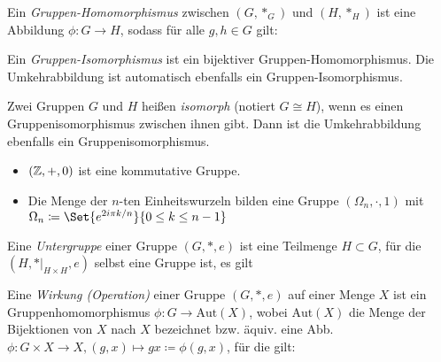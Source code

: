 \documentclass{cheat-sheet}
\begin{document}

\begin{defn}
  Ein \emph{Gruppen-Homomorphismus} zwischen $(G, *_G)$ und $(H, *_H)$ ist eine Abbildung $\phi : G \to H$, sodass für alle $g, h \in G$ gilt:
  \begin{itemize}
  \end{itemize}
\end{defn}

\begin{defn}
  Ein \emph{Gruppen-Isomorphismus} ist ein bijektiver Gruppen-Homomorphismus. Die Umkehrabbildung ist automatisch ebenfalls ein Gruppen-Isomorphismus.
\end{defn}

\begin{defn}
  Zwei Gruppen $G$ und $H$ heißen \emph{isomorph} (notiert $G \cong H$), wenn es einen Gruppenisomorphismus zwischen ihnen gibt. Dann ist die Umkehrabbildung ebenfalls ein Gruppenisomorphismus.
\end{defn}

\begin{bspe}
  \begin{itemize}
    \item $(\mathbb{Z}, +, 0)$ ist eine kommutative Gruppe.
    \item Die Menge der $n$-ten Einheitswurzeln bilden eine Gruppe $(\Omega_n, \cdot, 1)$ mit $\Omega_n \coloneqq \Set{ e^{2i \pi k/n} }{ 0 \leq k \leq n - 1 }$
  \end{itemize}
\end{bspe}

\begin{defn}
  Eine \emph{Untergruppe} einer Gruppe $(G, *, e)$ ist eine Teilmenge $H \subset G$, für die $(H, *|_{H \times H}, e)$ selbst eine Gruppe ist, \dh{} es gilt
  \begin{itemize}
  \end{itemize}
\end{defn}



\begin{defn}
  Eine \emph{Wirkung (Operation)} einer Gruppe $(G, *, e)$ auf einer Menge $X$ ist ein Gruppenhomomorphismus $\phi : G \to \mathrm{Aut}(X)$, wobei $\mathrm{Aut}(X)$ die Menge der Bijektionen von $X$ nach $X$ bezeichnet bzw. äquiv. eine Abb. $\phi : G \times X \to X, (g, x) \mapsto gx \coloneqq \phi(g, x)$, für die gilt:
  \begin{itemize}
  \end{itemize}
\end{defn}
\end{document}
